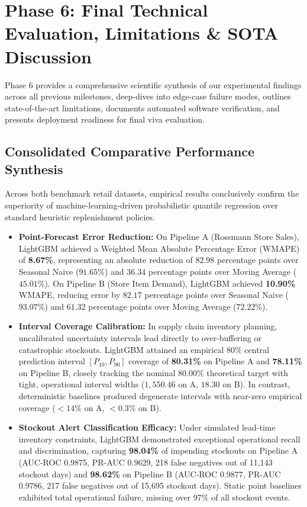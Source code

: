 \documentclass[11pt,a4paper]{article}
\begin{document}
\FloatBarrier
\newpage

\section{Phase 6: Final Technical Evaluation, Limitations \& SOTA Discussion}

Phase 6 provides a comprehensive scientific synthesis of our experimental findings across all previous milestones, deep-dives into edge-case failure modes, outlines state-of-the-art limitations, documents automated software verification, and presents deployment readiness for final viva evaluation.

\subsection{Consolidated Comparative Performance Synthesis}
Across both benchmark retail datasets, empirical results conclusively confirm the superiority of machine-learning-driven probabilistic quantile regression over standard heuristic replenishment policies.
\begin{itemize}
    \item \textbf{Point-Forecast Error Reduction:} On Pipeline A (Rossmann Store Sales), LightGBM achieved a Weighted Mean Absolute Percentage Error (WMAPE) of \textbf{8.67\%}, representing an absolute reduction of $82.98$ percentage points over Seasonal Naive ($91.65\%$) and $36.34$ percentage points over Moving Average ($45.01\%$). On Pipeline B (Store Item Demand), LightGBM achieved \textbf{10.90\%} WMAPE, reducing error by $82.17$ percentage points over Seasonal Naive ($93.07\%$) and $61.32$ percentage points over Moving Average ($72.22\%$).
    \item \textbf{Interval Coverage Calibration:} In supply chain inventory planning, uncalibrated uncertainty intervals lead directly to over-buffering or catastrophic stockouts. LightGBM attained an empirical 80\% central prediction interval $[P_{10}, P_{90}]$ coverage of \textbf{80.31\%} on Pipeline A and \textbf{78.11\%} on Pipeline B, closely tracking the nominal 80.00\% theoretical target with tight, operational interval widths ($1,550.46$ on A, $18.30$ on B). In contrast, deterministic baselines produced degenerate intervals with near-zero empirical coverage ($<14\%$ on A, $<0.3\%$ on B).
    \item \textbf{Stockout Alert Classification Efficacy:} Under simulated lead-time inventory constraints, LightGBM demonstrated exceptional operational recall and discrimination, capturing \textbf{98.04\%} of impending stockouts on Pipeline A (AUC-ROC 0.9875, PR-AUC 0.9629, 218 false negatives out of 11,143 stockout days) and \textbf{98.62\%} on Pipeline B (AUC-ROC 0.9877, PR-AUC 0.9786, 217 false negatives out of 15,695 stockout days). Static point baselines exhibited total operational failure, missing over 97\% of all stockout events.
\end{itemize}
\end{document}
